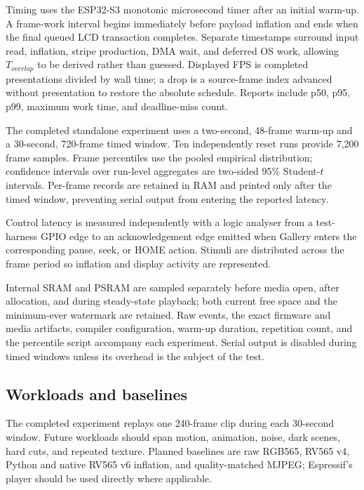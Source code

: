 \documentclass[11pt,twocolumn]{article}
\begin{document}
Timing uses the ESP32-S3 monotonic microsecond timer after an initial warm-up.
A frame-work interval begins immediately before payload inflation and ends
when the final queued LCD transaction completes.  Separate timestamps surround
input read, inflation, stripe production, DMA wait, and deferred OS work,
allowing $T_{overlap}$ to be derived rather than guessed.  Displayed FPS is
completed presentations divided by wall time; a drop is a source-frame index
advanced without presentation to restore the absolute schedule.  Reports
include p50, p95, p99, maximum work time, and deadline-miss count.

The completed standalone experiment uses a two-second, 48-frame warm-up and a
30-second, 720-frame timed window.  Ten independently reset runs provide 7,200
frame samples.  Frame percentiles use the pooled empirical distribution;
confidence intervals over run-level aggregates are two-sided 95\% Student-$t$
intervals.  Per-frame records are retained in RAM and printed only after the
timed window, preventing serial output from entering the reported latency.

Control latency is measured independently with a logic analyser from a
test-harness GPIO edge to an acknowledgement edge emitted when Gallery enters
the corresponding pause, seek, or HOME action.  Stimuli are distributed across
the frame period so inflation and display activity are represented.

Internal SRAM and PSRAM are sampled separately before media open, after
allocation, and during steady-state playback; both current free space and the
minimum-ever watermark are retained.  Raw events, the exact firmware and media
artifacts, compiler configuration, warm-up duration, repetition count, and the
percentile script accompany each experiment.  Serial output is disabled during
timed windows unless its overhead is the subject of the test.

\subsection{Workloads and baselines}

The completed experiment replays one 240-frame clip during each 30-second
window.  Future workloads should span motion, animation, noise, dark scenes,
hard cuts, and repeated texture.  Planned baselines are raw RGB565, RV565 v4,
Python and native RV565 v6 inflation, and quality-matched MJPEG; Espressif's
player should be used directly where applicable.
\end{document}
